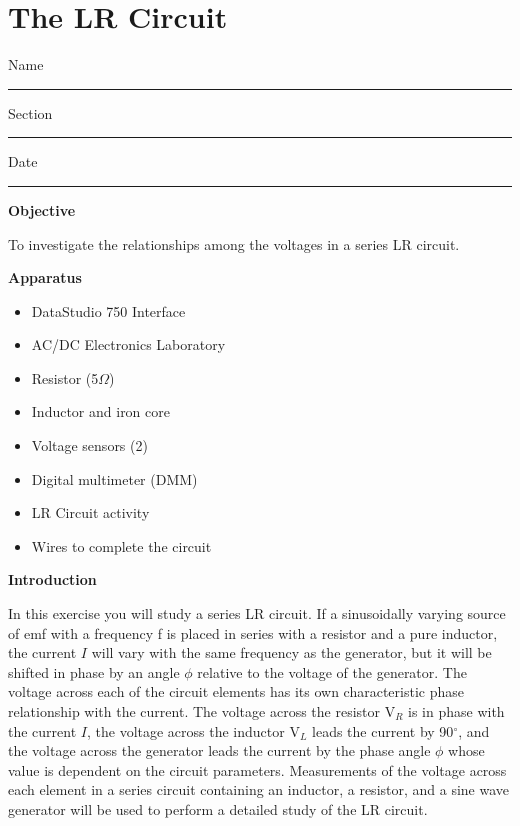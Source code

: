 
\section{The LR Circuit}

Name \rule{2.0in}{0.1pt}\hfill{}Section \rule{1.0in}{0.1pt}\hfill{}Date
\rule{1.0in}{0.1pt}

\textbf{Objective} 

To investigate the relationships among the voltages in a series LR
circuit.

\textbf{Apparatus} 

\begin{itemize}
\item DataStudio 750 Interface
\item AC/DC Electronics Laboratory
\item Resistor (5$\Omega$)
\item Inductor and iron core 
\item Voltage sensors (2)
\item Digital multimeter (DMM)
\item LR Circuit activity
\item Wires to complete the circuit
\end{itemize}
\textbf{Introduction} 

In this exercise you will study a series LR circuit. If a sinusoidally
varying source of emf with a frequency f is placed in series with
a resistor and a pure inductor, the current $I$ will vary with the same
frequency as the generator, but it will be shifted in phase by an
angle \( \phi  \) relative to the voltage of the generator. The voltage
across each of the circuit elements has its own characteristic phase
relationship with the current. The voltage across the resistor V\( _{R} \)
is in phase with the current $I$, the voltage across the inductor V\( _{L} \)
leads the current by 90\( ^{\circ } \), and the voltage across the
generator leads the current by the phase angle \( \phi  \) whose
value is dependent on the circuit parameters. Measurements of the
voltage across each element in a series circuit containing an inductor,
a resistor, and a sine wave generator will be used to perform a detailed
study of the LR circuit.

\vspace{0.3cm}
{\centering {} \par}
\vspace{0.3cm}

